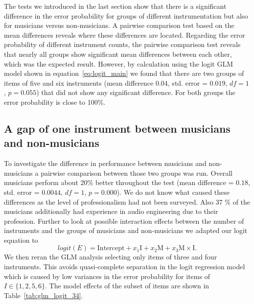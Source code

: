 The tests we introduced in the last section show that there is a significant difference in the error probability for groups of different instrumentation but also for musicians versus non-musicians. A pairwise comparison test based on the mean differences reveals where these differences are located. Regarding the error probability of different instrument counts, the pairwise comparison test reveals that nearly all groups show significant mean differences between each other, which was the expected result. However, by calculation using the logit GLM model shown in equation~\ref{eq:logit_main} we found that there are two groups of items of five and six instruments (mean difference $0.04$, std. error = $0.019$, $df = 1$, $p = 0.055$) that did not show any significant difference. For both groups the error probability is close to 100\%.
\subsection{A gap of one instrument between musicians and non-musicians}
To investigate the difference in performance between musicians and non-musicians a pairwise comparison between those two groups was run. Overall musicians perform about 20\% better throughout the test (mean difference = $0.18$, std. error = $ 0.0044$, $df = 1$, $p=0.000$). We do not know what caused these differences as the level of professionalism had not been surveyed. Also 37 \% of the musicians additionally had experience in audio engineering due to their profession. Further to look at possible interaction effects between the number of instruments and the groups of musicians and non-musicians we adapted our logit equation to
\begin{equation}
	logit(E) =  \text{Intercept} + x_1 \text{I} + x_2 \text{M} + x_3 \text{M}\times\text{I} .
	\label{eq:logit_interactions}
\end{equation}
We then reran the GLM analysis selecting only items of three and four instruments. This avoids quasi-complete separation in the logit regression model which is caused by low variances in the error probability for items of $I \in \{1,2,5,6\}$. The model effects of the subset of items are shown in Table~\ref{tab:glm_logit_34}.
